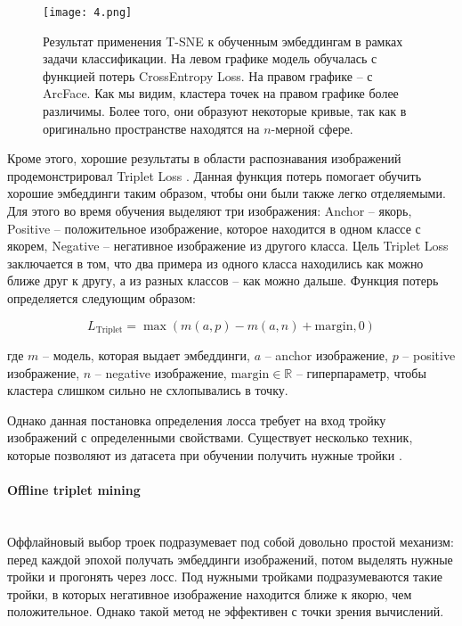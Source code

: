 \begin{figure}[htbp]
    \centering
    \texttt{[image: 4.png]}
    \captionsetup{width=0.9\textwidth}
    \caption{Результат применения T-SNE к обученным эмбеддингам в рамках задачи классификации. На левом графике модель обучалась с функцией потерь CrossEntropy Loss. На правом графике -- с ArcFace. Как мы видим, кластера точек на правом графике более различимы. Более того, они образуют некоторые кривые, так как в оригинально пространстве находятся на $n$-мерной сфере.}
    \label{fig:ce_vs_arcface}
\end{figure}

Кроме этого, хорошие результаты в области распознавания изображений продемонстрировал Triplet Loss \cite{triplet_loss}\cite{netvlad}. Данная функция потерь помогает обучить хорошие эмбеддинги таким образом, чтобы они были также легко отделяемыми. Для этого во время обучения выделяют три изображения: Anchor -- якорь, Positive -- положительное изображение, которое находится в одном классе с якорем, Negative -- негативное изображение из другого класса. Цель Triplet Loss заключается в том, что два примера из одного класса находились как можно ближе друг к другу, а из разных классов -- как можно дальше. Функция потерь определяется следующим образом:

$$
L_{\text{Triplet}} = \max(m(a, p) - m(a, n) + \text{margin}, 0)
$$

\noindent
где $m$ -- модель, которая выдает эмбеддинги, $a$ -- anchor изображение, $p$ -- positive изображение, $n$ -- negative изображение, $\text{margin} \in \mathbb{R}$ -- гиперпараметр, чтобы кластера слишком сильно не схлопывались в точку.

Однако данная постановка определения лосса требует на вход тройку изображений с определенными свойствами. Существует несколько техник, которые позволяют из датасета при обучении получить нужные тройки \cite{tiplet_online}.

\paragraph{Offline triplet mining}\mbox{} \\

Оффлайновый выбор троек подразумевает под собой довольно простой механизм: перед каждой эпохой получать эмбеддинги изображений, потом выделять нужные тройки и прогонять через лосс. Под нужными тройками подразумеваются такие тройки, в которых негативное изображение находится ближе к якорю, чем положительное. Однако такой метод не эффективен с точки зрения вычислений.

